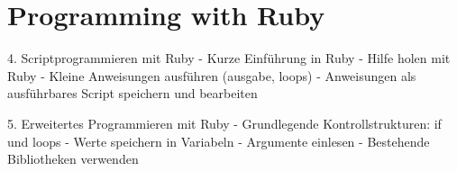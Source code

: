 \documentclass[10pt,a4paper]{scrartcl}
\begin{document}
\section{Programming with Ruby}
4. Scriptprogrammieren mit Ruby
- Kurze Einführung in Ruby
- Hilfe holen mit Ruby
- Kleine Anweisungen ausführen (ausgabe, loops)
- Anweisungen als ausführbares Script speichern und bearbeiten

5. Erweitertes Programmieren mit Ruby
- Grundlegende Kontrollstrukturen: if und loops
- Werte speichern in Variabeln
- Argumente einlesen
- Bestehende Bibliotheken verwenden
\end{document}
